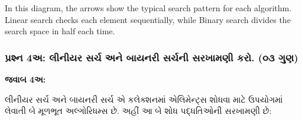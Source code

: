 In this diagram, the arrows show the typical search pattern for each
algorithm. Linear search checks each element sequentially, while Binary
search divides the search space in half each time.

\hypertarget{uxaaauxab0uxab6uxaa8-4uxa85-uxab2uxaa8uxaafuxab0-uxab8uxab0uxa9a-uxa85uxaa8-uxaacuxaafuxaa8uxab0-uxab8uxab0uxa9auxaa8-uxab8uxab0uxa96uxaaeuxaa3-uxa95uxab0.-uxae6uxae9-uxa97uxaa3}{%
\subsubsection{પ્રશ્ન 4અ: લીનીયર સર્ચ અને બાયનરી સર્ચની સરખામણી કરો. (૦૩
ગુણ)}\label{uxaaauxab0uxab6uxaa8-4uxa85-uxab2uxaa8uxaafuxab0-uxab8uxab0uxa9a-uxa85uxaa8-uxaacuxaafuxaa8uxab0-uxab8uxab0uxa9auxaa8-uxab8uxab0uxa96uxaaeuxaa3-uxa95uxab0.-uxae6uxae9-uxa97uxaa3}}

\textbf{જવાબ 4અ:}

લીનીયર સર્ચ અને બાયનરી સર્ચ એ કલેક્શનમાં એલિમેન્ટ્સ શોધવા માટે ઉપયોગમાં લેવાતી બે
મૂળભૂત અલ્ગોરિધમ્સ છે. અહીં આ બે શોધ પદ્ધતિઓની સરખામણી છે:

